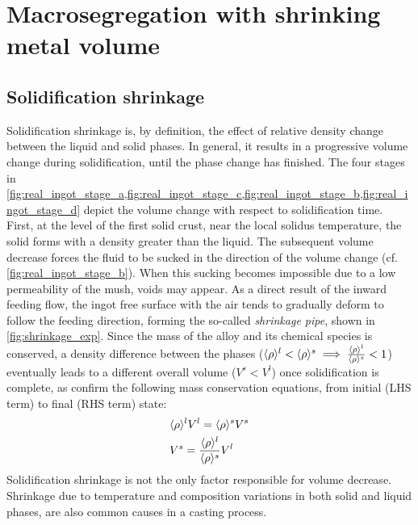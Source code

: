\chapter{Macrosegregation with shrinking metal volume}
\begin{nolinkcolors}
\minitoc
\end{nolinkcolors}
\newpage

\section{Solidification shrinkage}

Solidification shrinkage is, by definition, the effect of relative density change between the liquid and solid phases.
In general, it results in a progressive volume change during solidification, until the phase change has finished. 
The four stages in \cref{fig:real_ingot_stage_a,fig:real_ingot_stage_c,fig:real_ingot_stage_b,fig:real_ingot_stage_d} depict the volume change with 
respect to solidification time.
First, at the level of the first solid crust, near the local solidus temperature, the solid forms with a density greater than 
the liquid. The subsequent volume decrease forces the fluid to be sucked in the direction of the volume change 
(cf. \cref{fig:real_ingot_stage_b}). 
When this sucking becomes impossible due to a low permeability of the mush, voids may appear.
As a direct result of the inward feeding flow, the ingot free surface with the air
tends to gradually deform to follow the feeding direction, forming the so-called \emph{shrinkage pipe}, shown in \cref{fig:shrinkage_exp}. 
Since the mass of the alloy and its chemical species is conserved, 
a density difference between the phases ($\langle \rho \rangle^l < \langle \rho \rangle^s \implies \frac{\langle \rho \rangle^l}{\langle \rho \rangle^s}<1$) eventually leads 
to a different overall volume ($V^s<V^l$) once solidification is complete, as confirm the following mass conservation equations, 
from initial (LHS term) to final (RHS term) state:
\begin{subequations}
\begin{align}
& \langle \rho \rangle^l V^l = \langle \rho \rangle^s V^s  \\ 
& V^s = \frac{\langle \rho \rangle^l}{\langle \rho \rangle^s} V^l
\end{align}
\end{subequations}
Solidification shrinkage is not the only factor responsible for volume decrease. 
Shrinkage due to temperature and composition variations in both solid and liquid phases, are also common causes in a casting process. 
